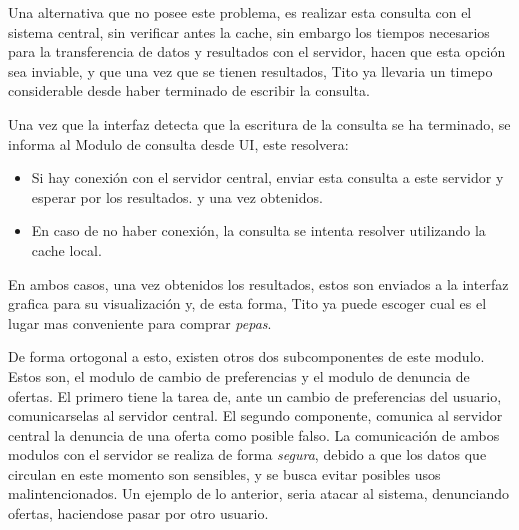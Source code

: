 Una alternativa que no posee este problema, es realizar esta consulta con el sistema central, sin verificar antes la cache, sin embargo los tiempos necesarios para la transferencia de datos y resultados con el servidor, hacen que esta opción sea inviable, y que una vez que se tienen resultados, Tito ya llevaria un timepo considerable desde haber terminado de escribir la consulta.

Una vez que la interfaz detecta que la escritura de la consulta se ha terminado, se informa al \textsf{Modulo de consulta desde UI}, este resolvera:
\begin{itemize}
	\item Si hay conexión con el servidor central, enviar esta consulta a este servidor y esperar por los resultados. y una vez obtenidos.
	\item En caso de no haber conexión, la consulta se intenta resolver utilizando la cache local.
\end{itemize}

En ambos casos, una vez obtenidos los resultados, estos son enviados a la interfaz grafica para su visualización y, de esta forma, Tito ya puede escoger cual es el lugar mas conveniente para comprar \emph{pepas}.

De forma ortogonal a esto, existen otros dos subcomponentes de este modulo. Estos son, el \textsf{modulo de cambio de preferencias} y el \textsf{modulo de denuncia de ofertas}. El primero tiene la tarea de, ante un cambio de preferencias del usuario, comunicarselas al servidor central. El segundo componente, comunica al servidor central la denuncia de una oferta como posible falso. La comunicación de ambos modulos con el servidor se realiza de forma \emph{segura}, debido a que los datos que circulan en este momento son sensibles, y se busca evitar posibles usos malintencionados. Un ejemplo de lo anterior, seria atacar al sistema, denunciando ofertas, haciendose pasar por otro usuario. 


